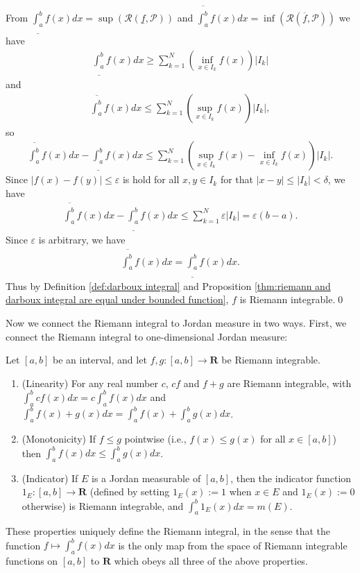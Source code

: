\documentclass{book}
\theoremstyle{defstyle}
\theoremstyle{thmstyle}
\newcounter{Proposition}[section]
\begin{document}
From $\underline{\int_{a}^{b}}f(x)dx = \sup(\mathcal{R}(\underline{f}, \mathcal{P}))$ and $\overline{\int_{a}^{b}}f(x)dx = \inf(\mathcal{R}(\overline{f}, \mathcal{P}))$ we have
    \begin{align*}
        \underline{\int_{a}^{b}}f(x)dx \geq \sum_{k = 1}^{N}(\inf_{x \in I_k}f(x))|I_k|
    \end{align*}
and
    \begin{align*}
        \overline{\int_{a}^{b}}f(x)dx \leq \sum_{k = 1}^{N}(\sup_{x \in I_k}f(x))|I_k|,
    \end{align*}
so
    \begin{align*}
        \overline{\int_{a}^{b}}f(x)dx - \underline{\int_{a}^{b}}f(x)dx
        \leq \sum_{k = 1}^{N}(\sup_{x \in I_k}f(x) - \inf_{x \in I_k}f(x))|I_k|.
    \end{align*}
Since $|f(x) - f(y)| \leq \varepsilon$ is hold for all $x, y \in I_k$ for that $|x - y| \leq |I_k| < \delta$, we have
    \begin{align*}
        \overline{\int_{a}^{b}}f(x)dx - \underline{\int_{a}^{b}}f(x)dx
        \leq \sum_{k = 1}^{N}\varepsilon|I_k|
        = \varepsilon(b - a).
    \end{align*}
Since $\varepsilon$ is arbitrary, we have
    \begin{align*}
        \overline{\int_{a}^{b}}f(x)dx = \underline{\int_{a}^{b}}f(x)dx.
    \end{align*}
Thus by Definition \ref{def:darboux integral} and Proposition \ref{thm:riemann and darboux integral are equal under bounded function}, $f$ is Riemann integrable.\qed


Now we connect the Riemann integral to Jordan measure in two ways. First, we connect the Riemann integral to one-dimensional Jordan measure:
\begin{theorem}\label{thm:basic properties of the riemann integral}
    Let $[a, b]$ be an interval, and let $f,g : [a, b] \to \mathbf{R}$ be Riemann integrable.
        \begin{enumerate}
            \item (Linearity) For any real number $c$, $cf$ and $f + g$ are Riemann integrable, with $\int_{a}^{b}cf(x)dx = c\int_{a}^{b}f(x)dx$ and $\int_{a}^{b}f(x) + g(x)dx = \int_{a}^{b}f(x) + \int_{a}^{b}g(x)dx$.
            \item (Monotonicity) If $f \leq g$ pointwise (i.e., $f(x) \leq g(x)$ for all $x \in [a, b]$) then $\int_{a}^{b}f(x)dx \leq \int_{a}^{b}g(x)dx$.
            \item (Indicator) If $E$ is a Jordan measurable of $[a, b]$, then the indicator function $1_E : [a, b] \to \mathbf{R}$ (defined by setting $1_E(x) := 1$ when $x \in E$ and $1_E(x):= 0$ otherwise) is Riemann integrable, and $\int_{a}^{b}1_E(x)dx = m(E)$.
        \end{enumerate}
    These properties uniquely define the Riemann integral, in the sense that the function $f \mapsto \int_{a}^{b}f(x)dx$ is the only map from the space of Riemann integrable functions on $[a, b]$ to $\mathbf{R}$ which obeys all three of the above properties.
\end{theorem}
\end{document}
